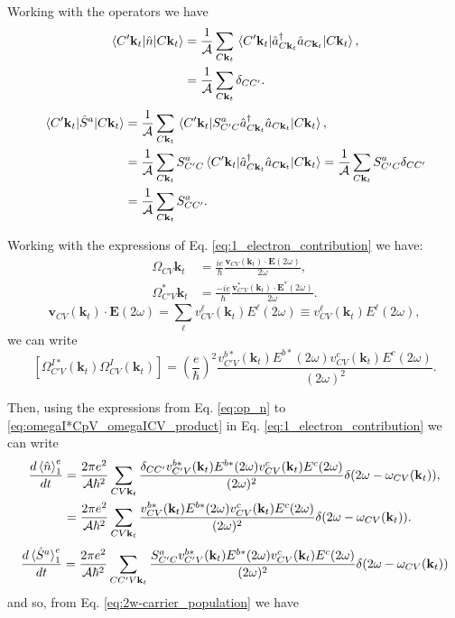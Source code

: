 \documentclass{article}
\newcommand{\kt}{\mathbf{k}_{t}}
\newcommand{\dw}{\delta(2\omega - \omega_{CV}(\kt))}
\begin{document}
Working with the operators we have 
\begin{align}
\mel*{C'\kt}{\hat{n}}{C\kt}
&= \frac{1}{\mathcal{A}} \sum_{C\kt} 
\mel*{C'\kt}{\hat{a}^{\dag}_{C\kt} \hat{a}_{C\kt}}{C\kt} , \nonumber \\
&= \frac{1}{\mathcal{A}} \sum_{C\kt} \delta_{CC'} . \label{eq:op_n}
\end{align}
\begin{align}
\mel*{C'\kt}{\hat{S}^{a}}{C\kt}
&= \frac{1}{\mathcal{A}} \sum_{C\kt} 
\mel*{C'\kt}{S^{a}_{C'C}\hat{a}^{\dag}_{C\kt} \hat{a}_{C\kt}}{C\kt} , \nonumber \\
&= \frac{1}{\mathcal{A}} \sum_{C\kt} 
S^{a}_{C'C}\mel*{C'\kt}{\hat{a}^{\dag}_{C\kt} \hat{a}_{C\kt}}{C\kt}
= \frac{1}{\mathcal{A}} \sum_{C\kt} S^{a}_{C'C}\delta_{CC'} \nonumber \\
&= \frac{1}{\mathcal{A}} \sum_{C\kt} S^{a}_{CC'} . \label{eq:op_S}
\end{align}

Working with the expressions of Eq. \eqref{eq:1_electron_contribution}
we have: 
\begin{align*}\label{eq:omegaICV_omegaI*VpV}
\Omega_{CV}{\kt} &= \frac{ie}{\hbar}
\frac{\mathbf{v}_{CV}(\kt) \cdot \mathbf{E}(2\omega)}{2\omega} , \\
\Omega^{*}_{C'V}{\kt} &= \frac{-ie}{\hbar}
\frac{\mathbf{v}^{*}_{C'V}(\kt) \cdot \mathbf{E}^{*}(2\omega)}{2\omega} .
\end{align*}
\begin{equation}\label{eq:dot_product}
\mathbf{v}_{CV}(\kt) \cdot \mathbf{E}(2\omega)
= \sum_{\ell} v^{\ell}_{CV}(\kt) E^{\ell}(2\omega) \equiv v^{\ell}_{CV}(\kt)
E^{\ell}(2\omega) ,
\end{equation}
we can write 
\begin{equation}\label{eq:omegaI*CpV_omegaICV_product}
[\Omega^{I*}_{C'V}(\kt) \Omega^{I}_{CV}(\kt)] =
\left( \frac{e}{\hbar} \right)^{2} 
\frac{v^{b*}_{C'V}(\kt)E^{b*}(2\omega)v^{c}_{CV}(\kt)E^{c}(2\omega)}{(2\omega)^{2}} .
\end{equation}

Then, using the expressions from Eq. \eqref{eq:op_n} to
\eqref{eq:omegaI*CpV_omegaICV_product} in Eq. 
\eqref{eq:1_electron_contribution} we can write
\begin{align}
\frac{d\ev*{\hat{n}}^{e}_{1}}{dt} &= 
\frac{2\pi e^{2}}{\mathcal{A}\hbar^{2}} \sum_{CV\kt}
\frac{\delta_{CC'}v^{b*}_{C'V}(\kt)E^{b*}(2\omega)v^{c}_{CV}(\kt)
E^{c}(2\omega)}{(2\omega)^{2}} \dw , \nonumber \\
&= \frac{2\pi e^{2}}{\mathcal{A}\hbar^{2}} \sum_{CV\kt}
\frac{v^{b*}_{CV}(\kt)E^{b*}(2\omega)v^{c}_{CV}(\kt)
E^{c}(2\omega)}{(2\omega)^{2}} \dw . \label{eq:2w_n-final}
\end{align}
\begin{equation}\label{2w_eq:S-final}
\frac{d\ev*{\hat{S}^{a}}^{e}_{1}}{dt} = 
\frac{2\pi e^{2}}{\mathcal{A}\hbar^{2}} \sum_{CC'V\kt} 
\frac{S^{a}_{C'C}v^{b*}_{C'V}(\kt)E^{b*}(2\omega)v^{c}_{CV}(\kt)E^{c}(2\omega)}
{(2\omega)^{2}}\dw
\end{equation}
and so, from Eq. \eqref{eq:2w-carrier_population} we have 
\end{document}
